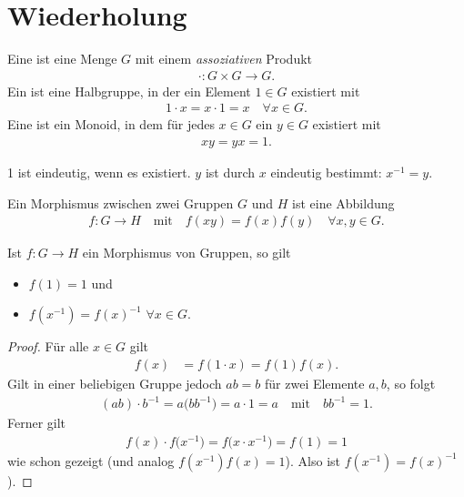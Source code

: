 ﻿\section{Wiederholung}
\begin{definition}
	Eine  ist eine Menge $G$ mit einem \emph{assoziativen} Produkt
	\begin{align*}
		\cdot\colon G \times G \to G.
	\end{align*}
	Ein  ist eine Halbgruppe, in der ein Element $1 \in G$ existiert mit 
	\begin{align*}
		1\cdot x = x\cdot 1 = x \quad\forall x \in G.
	\end{align*}
	Eine  ist ein Monoid, in dem für jedes $x \in G$ ein $y \in G$ existiert mit
	\begin{align*}
		xy = yx = 1.
	\end{align*}
\end{definition}

\begin{remark}
		1 ist eindeutig, wenn es existiert. $y$ ist durch $x$ eindeutig bestimmt: $x^{-1} = y$.
\end{remark}

\begin{definition}[Morphismus]
	Ein Morphismus zwischen zwei Gruppen $G$ und $H$ ist eine Abbildung
	\begin{align*}
		f\colon G \to H \quad\text{mit}\quad f(xy) = f(x)f(y) \quad\forall x,y \in G.
	\end{align*}
\end{definition}

\begin{proposition}
	Ist $f\colon G \to H$ ein Morphismus von Gruppen, so gilt\begin{itemize}
		\item $f(1) = 1$ und
		\item $f(x^{-1}) = f(x)^{-1}$ $\forall x\in G$.
	\end{itemize}
\end{proposition}
\begin{proof}
	Für alle $x \in G$ gilt \begin{align*}
		f(x) &= f(1\cdot x) = f(1)f(x).
	\end{align*}
	Gilt in einer beliebigen Gruppe jedoch $ab=b$ für zwei Elemente $a,b$, so folgt
	\begin{align*}
		(ab)\cdot b^{-1} = a\big(bb^{-1}\big) = a\cdot 1 = a \quad\text{mit}\quad bb^{-1} = 1.
	\end{align*}
	Ferner gilt \begin{align*}
		f(x)\cdot f\big(x^{-1}\big) = f\big(x \cdot x^{-1}\big) = f(1) = 1
	\end{align*}
	wie schon gezeigt (und analog $f(x^{-1})f(x) = 1$). Also ist $f(x^{-1}) = f(x)^{-1}$).
\end{proof}

